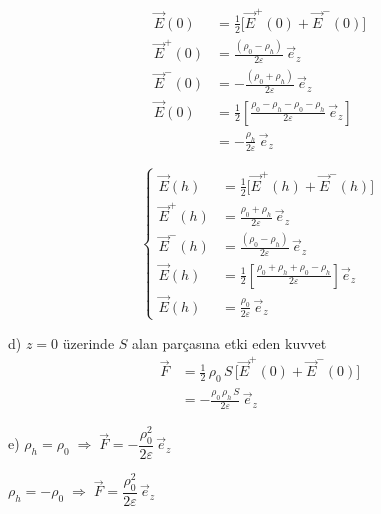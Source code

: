 \documentclass[11pt,a4paper]{article}
\begin{document}
\noindent
\begin{minipage}[t]{0.49\linewidth}
\begin{align*}
\vec E(0) &= \tfrac12\bigl[\vec E^{+}(0)+\vec E^{-}(0)\bigr] \\
\vec E^{+}(0) &= \frac{(\rho_0-\rho_h)}{2\varepsilon}\,\vec e_z \\
\vec E^{-}(0) &= -\frac{(\rho_0+\rho_h)}{2\varepsilon}\,\vec e_z \\
\vec E(0) &= \frac12\left[\frac{\rho_0-\rho_h-\rho_0-\rho_h}{2\varepsilon}\,\vec e_z\right] \\
 &= -\frac{\rho_h}{2\varepsilon}\,\vec e_z
\end{align*}
\end{minipage}\hfill
\begin{minipage}[t]{0.47\linewidth}
\[
\left\{\begin{aligned}
\vec E(h) &= \tfrac12\bigl[\vec E^{+}(h)+\vec E^{-}(h)\bigr] \\
\vec E^{+}(h) &= \frac{\rho_0+\rho_h}{2\varepsilon}\,\vec e_z \\
\vec E^{-}(h) &= \frac{(\rho_0-\rho_h)}{2\varepsilon}\,\vec e_z \\
\vec E(h) &= \frac12\left[\frac{\rho_0+\rho_h+\rho_0-\rho_h}{2\varepsilon}\right]\vec e_z \\
\vec E(h) &= \frac{\rho_0}{2\varepsilon}\,\vec e_z
\end{aligned}\right.
\]
\end{minipage}

d) $z=0$ üzerinde $S$ alan parçasına etki eden kuvvet
\begin{align*}
\vec F &= \frac12\,\rho_0\,S\,\bigl[\vec E^{+}(0)+\vec E^{-}(0)\bigr] \\
 &= -\frac{\rho_0\,\rho_h\,S}{2\varepsilon}\,\vec e_z
\end{align*}

e) $\rho_h=\rho_0 \;\Rightarrow\; \vec F = -\dfrac{\rho_0^{2}}{2\varepsilon}\,\vec e_z$

\hspace{1.5em}$\rho_h=-\rho_0 \;\Rightarrow\; \vec F = \dfrac{\rho_0^{2}}{2\varepsilon}\,\vec e_z$
\end{document}
